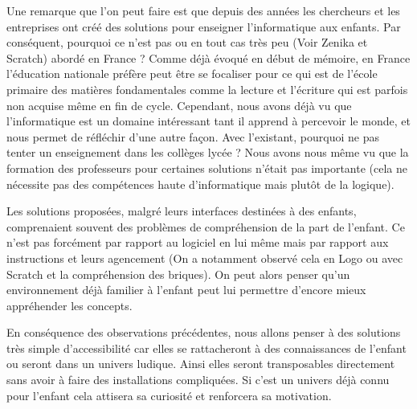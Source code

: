 Une remarque que l'on peut faire est que depuis des années les chercheurs et les entreprises ont créé des solutions pour enseigner l'informatique aux enfants. Par conséquent, pourquoi ce n'est pas ou en tout cas très peu (Voir Zenika et Scratch) abordé en France ? Comme déjà évoqué en début de mémoire, en France l'éducation nationale préfère peut être se focaliser pour ce qui est de l'école primaire des matières fondamentales comme la lecture et l'écriture qui est parfois non acquise même en fin de cycle. Cependant, nous avons déjà vu que l'informatique est un domaine intéressant tant il apprend à percevoir le monde, et nous permet de réfléchir d'une autre façon. \cite{53} Avec l'existant, pourquoi ne pas tenter un enseignement dans les collèges lycée ? Nous avons nous même vu que la formation des professeurs pour certaines solutions n'était pas importante (cela ne nécessite pas des compétences haute d'informatique mais plutôt de la logique).

Les solutions proposées, malgré leurs interfaces destinées à des enfants, comprenaient souvent des problèmes de compréhension de la part de l'enfant. Ce n'est pas forcément par rapport au logiciel en lui même mais par rapport aux instructions et leurs agencement (On a notamment observé cela en Logo ou avec Scratch et la compréhension des briques). On peut alors penser qu'un environnement déjà familier à l'enfant peut lui permettre d'encore mieux appréhender les concepts.

En conséquence des observations précédentes, nous allons penser à des solutions très simple d'accessibilité car elles se rattacheront à des connaissances de l'enfant ou seront dans un univers ludique. Ainsi elles seront transposables directement sans avoir à faire des installations compliquées. Si c'est un univers déjà connu pour l'enfant cela attisera sa curiosité et renforcera sa motivation. 

\newpage



